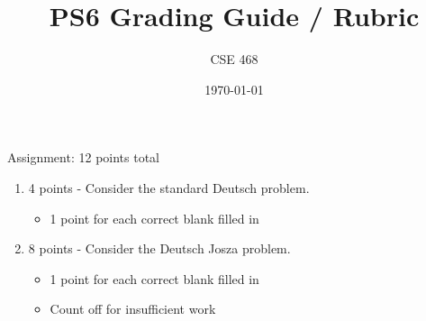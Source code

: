 \documentclass[12pt]{article}
\title{PS6 Grading Guide / Rubric}
\author{CSE 468}
\date{\today}
\begin{document}
\maketitle

Assignment: 12 points total
\begin{enumerate}[font=\bfseries]
    \item 4 points - Consider the standard Deutsch problem.
    \begin{itemize}
        \item 1 point for each correct blank filled in
    \end{itemize}
    \item 8 points - Consider the Deutsch Josza problem.
    \begin{itemize}
        \item 1 point for each correct blank filled in
        \item Count off for insufficient work
    \end{itemize}
\end{enumerate}
\end{document}
